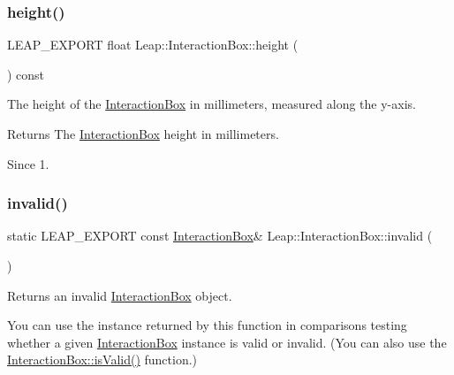 \subsubsection{\texorpdfstring{height()}{height()}}
{\footnotesize\ttfamily L\+E\+A\+P\+\_\+\+E\+X\+P\+O\+RT float Leap\+::\+Interaction\+Box\+::height (\begin{DoxyParamCaption}{ }\end{DoxyParamCaption}) const}

The height of the \hyperlink{class_leap_1_1_interaction_box}{Interaction\+Box} in millimeters, measured along the y-\/axis.


\begin{DoxyCodeInclude}
\end{DoxyCodeInclude}


\begin{DoxyReturn}{Returns}
The \hyperlink{class_leap_1_1_interaction_box}{Interaction\+Box} height in millimeters. 
\end{DoxyReturn}
\begin{DoxySince}{Since}
1. 
\end{DoxySince}
\mbox{\label{class_leap_1_1_interaction_box_af3d181a4077f0b7e7334e3eb4db4b019}} 
\subsubsection{\texorpdfstring{invalid()}{invalid()}}
{\footnotesize\ttfamily static L\+E\+A\+P\+\_\+\+E\+X\+P\+O\+RT const \hyperlink{class_leap_1_1_interaction_box}{Interaction\+Box}\& Leap\+::\+Interaction\+Box\+::invalid (\begin{DoxyParamCaption}{ }\end{DoxyParamCaption})\hspace{0.3cm}{\ttfamily [static]}}

Returns an invalid \hyperlink{class_leap_1_1_interaction_box}{Interaction\+Box} object.

You can use the instance returned by this function in comparisons testing whether a given \hyperlink{class_leap_1_1_interaction_box}{Interaction\+Box} instance is valid or invalid. (You can also use the \hyperlink{class_leap_1_1_interaction_box_afe6398e502c6d38b6150d3512395d0c8}{Interaction\+Box\+::is\+Valid()} function.)


